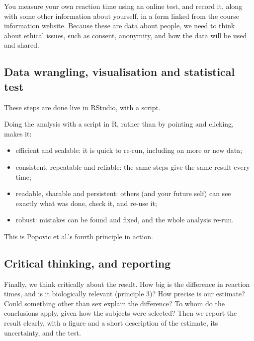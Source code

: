 \documentclass[
  letterpaper,
  8pt,
  a4paper]{book}
\providecommand{\tightlist}{%
  \setlength{\itemsep}{0pt}\setlength{\parskip}{0pt}}
\begin{document}
You measure your own reaction time using an online test, and record it,
along with some other information about yourself, in a form linked from
the course information website. Because these are data about people, we
need to think about ethical issues, such as consent, anonymity, and how
the data will be used and shared.

\subsection*{Data wrangling, visualisation and statistical
test}\label{data-wrangling-visualisation-and-statistical-test}

These steps are done live in RStudio, with a script.

Doing the analysis with a script in R, rather than by pointing and
clicking, makes it:

\begin{itemize}
\tightlist
\item
  efficient and scalable: it is quick to re-run, including on more or
  new data;
\item
  consistent, repeatable and reliable: the same steps give the same
  result every time;
\item
  readable, sharable and persistent: others (and your future self) can
  see exactly what was done, check it, and re-use it;
\item
  robust: mistakes can be found and fixed, and the whole analysis
  re-run.
\end{itemize}

This is Popovic et al.'s fourth principle in action.

\subsection*{Critical thinking, and
reporting}\label{critical-thinking-and-reporting}

Finally, we think critically about the result. How big is the difference
in reaction times, and is it biologically relevant (principle 3)? How
precise is our estimate? Could something other than sex explain the
difference? To whom do the conclusions apply, given how the subjects
were selected? Then we report the result clearly, with a figure and a
short description of the estimate, its uncertainty, and the test.
\end{document}
